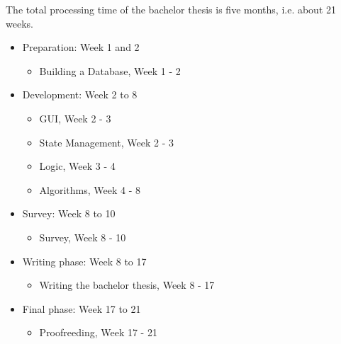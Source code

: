 The total processing time of the bachelor thesis is five months, i.e. about 21 weeks.
\begin{itemize}
	\item Preparation: Week 1 and 2 
		\begin{itemize}
			\item Building a Database, Week 1 - 2
		\end{itemize}
	\item Development: Week 2 to 8
		\begin{itemize}
			\item GUI, Week 2 - 3
			\item State Management, Week 2 - 3
			\item Logic, Week 3 - 4
			\item Algorithms, Week 4 - 8
		\end{itemize}
	\item Survey: Week 8 to 10
		\begin{itemize}
			\item Survey, Week 8 - 10
		\end{itemize}
	\item Writing phase: Week 8 to 17
		\begin{itemize}
			\item Writing the bachelor thesis, Week 8 - 17
		\end{itemize}
	\item Final phase: Week 17 to 21
		\begin{itemize}
			\item Proofreeding, Week 17 - 21
		\end{itemize}
\end{itemize}

\printbibliography








